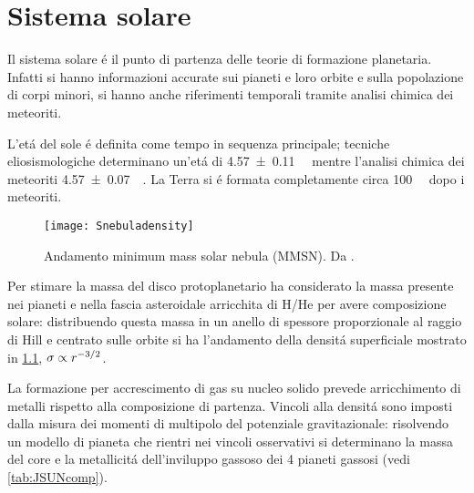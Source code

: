 
{\let\clearpage\relax\let\cleardoublepage\relax
\chapter{Sistema solare}
}
Il sistema solare \'e il punto di partenza delle teorie di formazione planetaria. Infatti si hanno informazioni accurate sui pianeti e loro orbite e sulla popolazione di corpi minori, si hanno anche riferimenti temporali tramite analisi chimica dei meteoriti.

L'et\'a del sole \'e definita come tempo in sequenza principale; tecniche eliosismologiche determinano un'et\'a di \SI{4.57+-0.11}{\giga\year} mentre l'analisi chimica dei meteoriti \SI{4.57+-0.07}{\giga\year}.
La Terra si \'e formata completamente circa \SI{100}{\mega\year} dopo i meteoriti.

\begin{figure}[!ht]
\texttt{[image: Snebuladensity]}\label{fig:Snebuladensity}\caption{Andamento minimum mass solar nebula (MMSN). Da \cite{weidenschilling1977distribution}.}
\end{figure}

Per stimare la massa del disco protoplanetario \cite{weidenschilling1977distribution} ha considerato la massa presente nei pianeti e nella fascia asteroidale arricchita di H/He per avere composizione solare: distribuendo questa massa in un anello di spessore proporzionale al raggio di Hill e centrato sulle orbite si ha l'andamento della densit\'a superficiale mostrato in \ref{fig:Snebuladensity}, $\sigma\propto r^{-3/2}$.

\begin{workout}

\end{workout}

La formazione per accrescimento di gas su nucleo solido prevede arricchimento di metalli rispetto alla composizione di partenza. Vincoli alla densit\'a sono imposti dalla misura dei momenti di multipolo del potenziale gravitazionale: risolvendo un modello di pianeta che rientri nei vincoli osservativi si determinano la massa del core e la metallicit\'a dell'inviluppo gassoso dei 4 pianeti gassosi (vedi  \ref{tab:JSUNcomp}).

